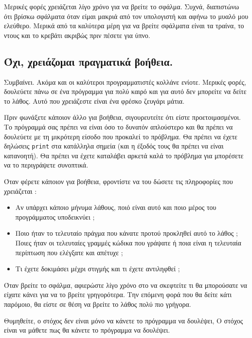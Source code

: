 \documentclass[10pt]{book}
\begin{document}
 Μερικές φορές χρειάζεται λίγο χρόνο για να βρείτε το σφάλμα. Συχνά, διαπιστώνω 
ότι βρίσκω σφάλματα όταν είμαι μακριά από τον υπολογιστή και αφήνω το μυαλό μου ελεύθερο.  Μερικά από τα καλύτερα μέρη για να βρείτε σφάλματα είναι τα τραίνα, το ντους και το κρεβάτι ακριβώς πριν πέσετε για ύπνο.


\subsection{Όχι, χρειάζομαι πραγματικά βοήθεια.}

Συμβαίνει.  Ακόμα και οι καλύτεροι προγραμματιστές κολλάνε ενίοτε.  
Μερικές φορές, δουλεύετε πάνω σε ένα πρόγραμμα για πολύ καιρό και για αυτό δεν 
μπορείτε να δείτε το λάθος.  Αυτό που χρειάζεστε είναι ένα φρέσκο ζευγάρι μάτια.

Πριν φωνάξετε κάποιον άλλο για βοήθεια, σιγουρευτείτε ότι είστε προετοιμασμένοι. 
Το πρόγραμμά σας πρέπει να είναι όσο το δυνατόν απλούστερο και θα πρέπει να δουλεύετε με τη μικρότερη είσοδο που προκαλεί το πρόβλημα.  Θα πρέπει να έχετε δηλώσεις  {\tt print}  στα κατάλληλα σημεία (και η έξοδός τους θα πρέπει να είναι κατανοητή).  Θα πρέπει να έχετε καταλάβει αρκετά καλά το πρόβλημα για μπορέσετε να το περιγράψετε συνοπτικά.

Όταν φέρετε κάποιον για βοήθεια, φροντίστε να του δώσετε τις πληροφορίες που 
χρειάζεται : 

\begin{itemize}

\item Αν υπάρχει κάποιο μήνυμα λάθους, ποιό είναι αυτό και ποιο μέρος 
του προγράμματος υποδεικνύει ; 

\item  Ποιο ήταν το τελευταίο πράγμα που κάνατε προτού προκληθεί αυτό το λάθος ;   Ποιες ήταν οι τελευταίες γραμμές κώδικα που γράψατε ή ποια είναι 
η τελευταία περίπτωση που ελέγξατε και απέτυχε ; 

\item Τι έχετε δοκιμάσει μέχρι στιγμής και τι έχετε αντιληφθεί ; 

\end{itemize}

Όταν βρείτε το σφάλμα, αφιερώστε λίγο χρόνο στο να σκεφτείτε τι θα μπορούσατε να 
είχατε κάνει για να το βρείτε γρηγορότερα.  Την επόμενη φορά που θα δείτε κάτι παρόμοιο, θα είστε σε θέση να βρείτε το λάθος πολύ πιο γρήγορα.

Θυμηθείτε, ο στόχος δεν είναι μόνο να κάνετε το πρόγραμμα να δουλέψει, Ο στόχος είναι να μάθετε πως θα κάνετε το πρόγραμμα να δουλέψει.
\end{document}
